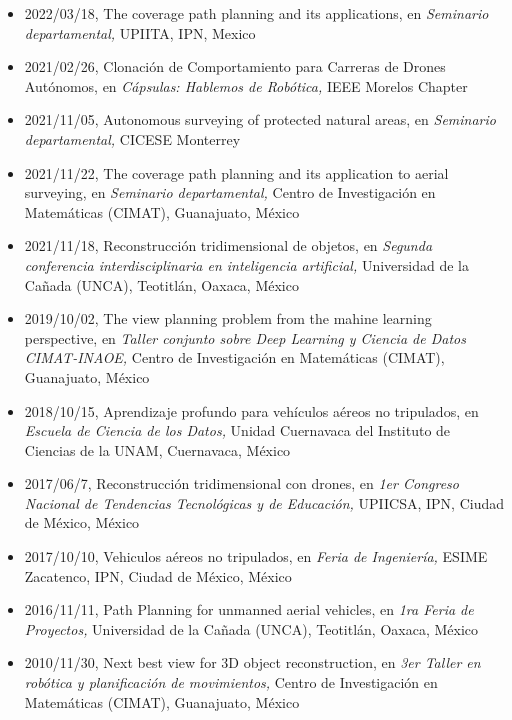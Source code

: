 \begin{itemize} 
\item 2022/03/18, The coverage path planning and its applications, en \textit{ Seminario departamental,} UPIITA, IPN, Mexico 
\item 2021/02/26, Clonación de Comportamiento para Carreras de Drones Autónomos, en \textit{ Cápsulas: Hablemos de Robótica,} IEEE Morelos Chapter 
\item 2021/11/05, Autonomous surveying of protected natural areas, en \textit{ Seminario departamental,} CICESE Monterrey 
\item 2021/11/22, The coverage path planning and its application to aerial surveying, en \textit{ Seminario departamental,} Centro de Investigación en Matemáticas (CIMAT), Guanajuato, México 
\item 2021/11/18, Reconstrucción tridimensional de objetos, en \textit{ Segunda conferencia interdisciplinaria en inteligencia artificial,} Universidad de la Cañada (UNCA), Teotitlán, Oaxaca, México 
\item 2019/10/02, The view planning problem from the mahine learning perspective, en \textit{ Taller conjunto sobre Deep Learning y Ciencia de Datos CIMAT-INAOE,} Centro de Investigación en Matemáticas (CIMAT), Guanajuato, México 
\item 2018/10/15, Aprendizaje profundo para vehículos aéreos no tripulados, en \textit{ Escuela de Ciencia de los Datos,} Unidad Cuernavaca del Instituto de Ciencias de la UNAM, Cuernavaca, México 
\item 2017/06/7, Reconstrucción tridimensional con drones, en \textit{ 1er Congreso Nacional de Tendencias Tecnológicas y de Educación,} UPIICSA, IPN, Ciudad de México, México 
\item 2017/10/10, Vehiculos aéreos no tripulados, en \textit{ Feria de Ingeniería,} ESIME Zacatenco, IPN, Ciudad de México, México 
\item 2016/11/11, Path Planning for unmanned aerial vehicles, en \textit{ 1ra Feria de Proyectos,} Universidad de la Cañada (UNCA), Teotitlán, Oaxaca, México 
\item 2010/11/30, Next best view for 3D object reconstruction, en \textit{ 3er Taller en robótica y planificación de movimientos,} Centro de Investigación en Matemáticas (CIMAT), Guanajuato, México 
\end{itemize} 
